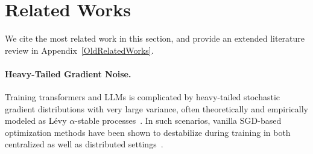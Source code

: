 \section{Related Works}
We cite the most related work in this section, and provide an extended literature review in Appendix~\ref{OldRelatedWorks}. 

\vspace{-1mm}
\paragraph{Heavy-Tailed Gradient Noise.} 
Training transformers and LLMs is complicated by heavy-tailed stochastic gradient distributions with very large variance, often theoretically and empirically modeled as L\'{e}vy $\alpha$-stable processes~\cite{linearattentionisallyouneed,heavytail1,heavytail2,heavytail3,inprobsupreme,heavytailedclassimbalance,HighProbAdaGConv}. In such scenarios, vanilla SGD-based %
optimization methods have been shown to destabilize during training in both centralized as well as distributed settings~\cite{EfficientAdaptiveFederatedOptimization,inprobsupreme,HeavyTailedNoisePaper}. %

